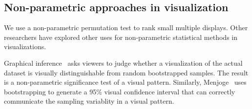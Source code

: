 \subsection{Non-parametric approaches in visualization}
We use a non-parametric permutation test to rank small multiple displays. Other researchers have explored other uses for non-parametric statistical methods in visualizations.

Graphical inference~\cite{Buja2009, Wickham2013, Majumder2013} asks viewers to judge whether a visualization of the actual dataset is visually distinguishable from random bootstrapped samples. The result is a non-parametric significance test of a visual pattern. Similarly, Menjoge~\cite{Menjoge2010} uses bootstrapping to generate a 95\% visual confidence interval that can correctly communicate the sampling variablity in a visual pattern. %


